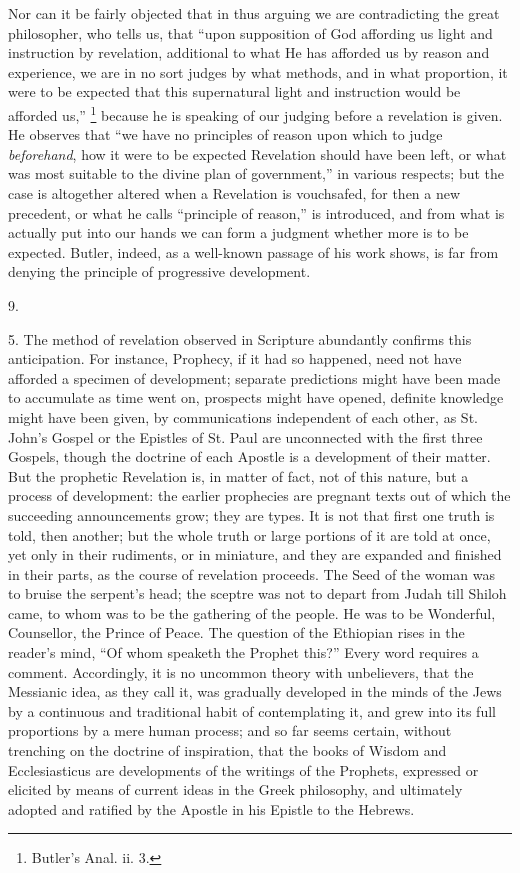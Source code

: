 Nor can it be fairly objected that in thus arguing we
are contradicting the great philosopher, who tells us,
that ``upon supposition of God affording us light and
instruction by revelation, additional to what He has
afforded us by reason and experience, we are in no sort
judges by what methods, and in what proportion, it were
to be expected that this supernatural light and
instruction would be afforded us,'' \footnote{Butler's Anal. ii. 3.} because he is speaking of our
judging before a revelation is given. He observes that
``we have no principles of reason upon which to judge
\emph{beforehand}, how it were to be expected Revelation
should have been left, or what was most suitable to the
divine plan of government,'' in various respects; but
the case is altogether altered when a Revelation is
vouchsafed, for then a new precedent, or what he calls
``principle of reason,'' is introduced, and from
what is actually put into our hands we can form a
judgment whether more is to be expected. Butler, indeed,
as a well-known passage of his work shows, is far from
denying the principle of progressive development.

9.

5. The method of revelation observed in Scripture
abundantly confirms this anticipation. For instance,
Prophecy, if it had so happened, need not have afforded a
specimen of development; separate predictions might have
been made to accumulate as time went on, prospects might
have opened, definite knowledge might have been given, by
communications independent of each other, as St. John's
Gospel or the Epistles of St. Paul are unconnected with
the first three Gospels, though the doctrine of each
Apostle is a development of their matter. But the
prophetic Revelation is, in matter of fact, not of this
nature, but a process of development: the earlier
prophecies are pregnant texts out of which the succeeding
announcements grow; they are types. It is not that first
one truth is told, then another; but the whole truth or
large portions of it are told at once, yet only in their
rudiments, or in miniature, and they are expanded and
finished in their parts, as the course of revelation
proceeds. The Seed of the woman was to bruise the
serpent's head; the sceptre was not to depart from Judah
till Shiloh came, to whom was to be the gathering of the
people. He was to be Wonderful, Counsellor, the Prince of
Peace. The question of the Ethiopian rises in the
reader's mind, ``Of whom speaketh the Prophet
this?'' Every word requires a comment. Accordingly,
it is no uncommon theory with unbelievers, that the
Messianic idea, as they call it, was gradually developed
in the minds of the Jews by a continuous and traditional
habit of contemplating it, and grew into its full
proportions by a mere human process; and so far seems
certain, without trenching on the doctrine of
inspiration, that the books of Wisdom and Ecclesiasticus
are developments of the writings of the Prophets,
expressed or elicited by means of current ideas in the
Greek philosophy, and ultimately adopted and ratified by
the Apostle in his Epistle to the Hebrews.

